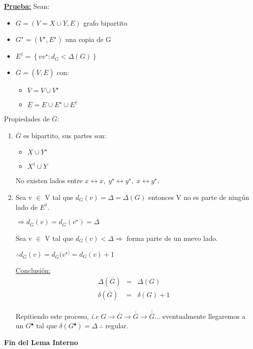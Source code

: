 \documentclass[12pt,a4paper]{report}
\begin{document}
				\underline{\textbf{Prueba:}} Sean:
					\begin{itemize}
						\item $G = (V = X \cup Y, E)$ grafo bipartito
						\item $G^{\star} = (V^{\star}, E^{\star})$ una copia de G
						\item $E^{\dag} = \left\lbrace vv^{\star} : d_{G} < \Delta(G) \right\rbrace$
						\item $\overline{G} = (\overline{V}, \overline{E})$ con:
							\begin{itemize}
								\item $\overline{V} = V \cup V^{\star}$
								\item $\overline{E} = E \cup E^{\star} \cup E^{\dag}$
							\end{itemize}
					\end{itemize}

					\par Propiedades de $\overline{G}$:
					\begin{enumerate}
						\item $\overline{G}$ es bipartito, sus partes son:
							\begin{itemize}
								\item $X \cup Y^{\star}$
								\item $X^{\dag} \cup Y$
							\end{itemize}
							\par No existen lados entre $x \leftrightarrow x, \; y^{\star} \leftrightarrow y^{\star}, \; x \leftrightarrow y^{\star}$.

						\item Sea v $\in$ V tal que $d_{G}(v) = \Delta = \Delta(G)$ entonces V no es parte de ningún lado de $E^{\dag}$.
							\par $\Rightarrow d_{\overline{G}}(v) = d_{\overline{G}}(v^{\star}) = \Delta$

							\vspace{5mm}
							\par Sea v $\in$ V tal que $d_{G}(v) < \Delta \Rightarrow$ forma parte de un nuevo lado.
							\par $\therefore d_{\overline{G}}(v) = d_{\overline{G}}(v^{\star)} = d_{G}(v) + 1$

							\vspace{5mm}
							\par \underline{Conclusión:}
							\begin{eqnarray}
								\nonumber \Delta(\overline{G}) &=& \Delta(G) \\
								\nonumber \delta(\overline{G}) &=& \delta(G) + 1
							\end{eqnarray}
							\par Repitiendo este proceso, \textit{i.e} $G \rightarrow \overline{G} \rightarrow \overline{\overline{G}} \rightarrow \overline{\overline{\overline{G}}} \dotsc $ eventualmente llegaremos a un $G^{\blacktriangle}$ tal que $\delta(G^{\blacktriangle}) = \Delta \; \therefore $ regular.
					\end{enumerate}
			\par 	\textbf{Fin del Lema Interno}
\end{document}
